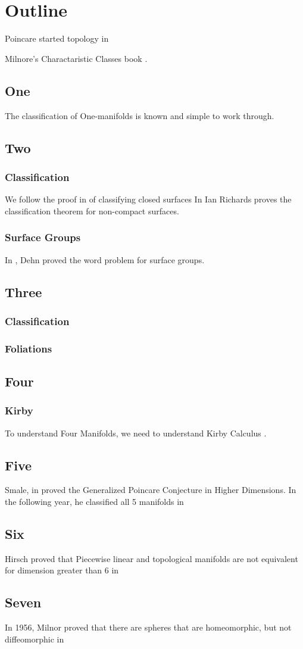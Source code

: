 \chapter*{Outline}

Poincare started topology in \cite{poincare_1895}


Milnore's Charactaristic Classes book \cite{milnor_stasheff_2009}.


\section{One}
The classification of One-manifolds is known and simple to work through.
\section{Two}
\subsection{Classification}
We follow the proof in \cite{munkres_2018} of classifying closed surfaces
In \cite{richards_1963} Ian Richards proves the classification theorem for non-compact surfaces.
\subsection{Surface Groups}
In \cite{dehn_1987}, Dehn proved the word problem for surface groups.

\section{Three}
\subsection{Classification}
\subsection{Foliations}

\section{Four}
\subsection{Kirby}
To understand Four Manifolds, we need to understand Kirby Calculus \cite{gompf_stipsicz_1999}.

\section{Five}
Smale, in \cite{smale_1960} proved the Generalized Poincare Conjecture in Higher Dimensions.
In the following year, he classified all 5 manifolds in \cite{smale_1962}

\section{Six}
Hirsch proved that Piecewise linear and topological manifolds are not equivalent for dimension greater than 6 in \cite{hirsch_1975}

\section{Seven}
In 1956, Milnor proved that there are spheres that are homeomorphic, but not diffeomorphic in \cite{milnor_1956}
